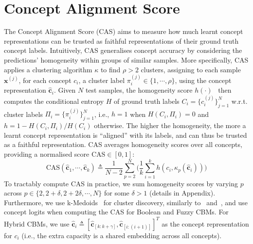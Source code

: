 \documentclass[withindex,glossary]{cam-thesis}
\theoremstyle{plain}
\theoremstyle{definition}
\theoremstyle{remark}
\begin{document}
\section{Concept Alignment Score}
The Concept Alignment Score (CAS) aims to measure how much learnt concept representations can be trusted as faithful representations of their ground truth concept labels. Intuitively, CAS generalises concept accuracy by considering the predictions' homogeneity within groups of similar samples. More specifically, CAS applies a clustering algorithm $\kappa$ to find $\rho > 2$ clusters, assigning to each sample $\mathbf{x}^{(j)}$, for each concept $c_i$, a cluster label $\pi_i^{(j)} \in \{1, \cdots, \rho\}$, using the concept representation $\hat{\textbf{c}}_i$. Given $N$ test samples, the homogeneity score $h(\cdot)$~\citep{rosenberg2007v} then computes the conditional entropy $H$ of ground truth labels $C_i = \{c_i^{(j)}\}_{j=1}^{N}$ w.r.t. cluster labels $\Pi_i = \{\pi_i^{(j)}\}_{j=1}^{N}$, i.e., $h = 1$ when $H(C_i,\Pi_i)=0$ and $h = 1 - H(C_i, \Pi_i)/H(C_i)$ otherwise. The higher the homogeneity, the more a learnt concept representation is ``aligned'' with its labels, and can thus be trusted as a faithful representation. CAS averages homogeneity scores over all concepts, providing a normalised score $\text{CAS} \in [0,1]$:
\begin{equation}
    \text{CAS}(\mathbf{\hat{c}}_1, \cdots, \mathbf{\hat{c}}_k) \triangleq \frac{1}{N - 2}\sum_{p=2}^N \Bigg(\frac{1}{k} \sum_{i=1}^k h(c_i, \kappa_p(\hat{\textbf{c}}_i)) \Bigg)
\end{equation}
To tractably compute CAS in practice, we sum homogeneity scores by varying $p$ across $p \in \{2, 2 + \delta, 2 + 2 \delta, \cdots, N\}$ for some $\delta > 1$ (details in Appendix). Furthermore, we use k-Medoids~\citep{kaufman1990partitioning} for cluster discovery, similarly to~\citet{ghorbani2019interpretation} and~\citet{magister2021gcexplainer}, and use concept logits when computing the CAS for Boolean and Fuzzy CBMs. For Hybrid CBMs, we use $\hat{\mathbf{c}}_i \triangleq [\hat{\mathbf{c}}_{[k:k + \gamma]}, \hat{\mathbf{c}}_{[i:(i + 1)]}]^T$ as the concept representation for $c_i$ (i.e., the extra capacity is a shared embedding across all concepts).
\end{document}
